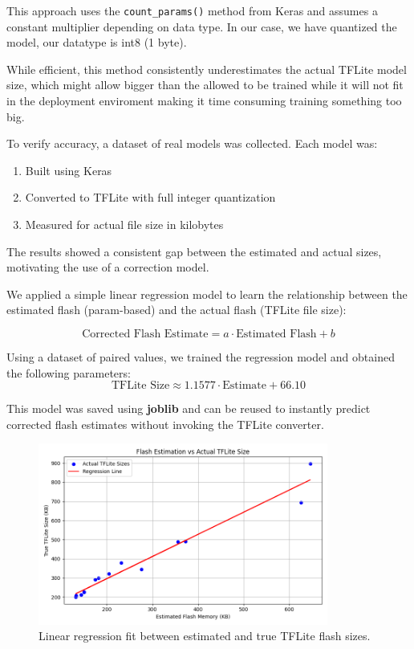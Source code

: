 This approach uses the \texttt{count\_params()} method from Keras and assumes a constant multiplier depending on data type. In our case, we have quantized the model, our datatype is int8 (1 byte).

While efficient, this method consistently underestimates the actual TFLite model size, which might allow bigger than the allowed to be trained while it will not fit in the deployment enviroment making it time consuming training something too big.

To verify accuracy, a dataset of real models was collected. Each model was:
\begin{enumerate}
    \item Built using Keras
    \item Converted to TFLite with full integer quantization
    \item Measured for actual file size in kilobytes
\end{enumerate}

The results showed a consistent gap between the estimated and actual sizes, motivating the use of a correction model.

We applied a simple linear regression model to learn the relationship between the estimated flash (param-based) and the actual flash (TFLite file size):

\[
\text{Corrected Flash Estimate} = a \cdot \text{Estimated Flash} + b
\]

Using a dataset of paired values, we trained the regression model and obtained the following parameters:
\[
\text{TFLite Size} \approx 1.1577 \cdot \text{Estimate} + 66.10
\]

 This model was saved using \textbf{joblib} and can be reused to instantly predict corrected flash estimates without invoking the TFLite converter.

 \begin{figure}[ht]
  \centering
  \includegraphics[width=0.85\textwidth]{Pictures/flash_regression_plot.png}
  \caption{Linear regression fit between estimated and true TFLite flash sizes.}
  \label{fig:flash-regression}
\end{figure}


